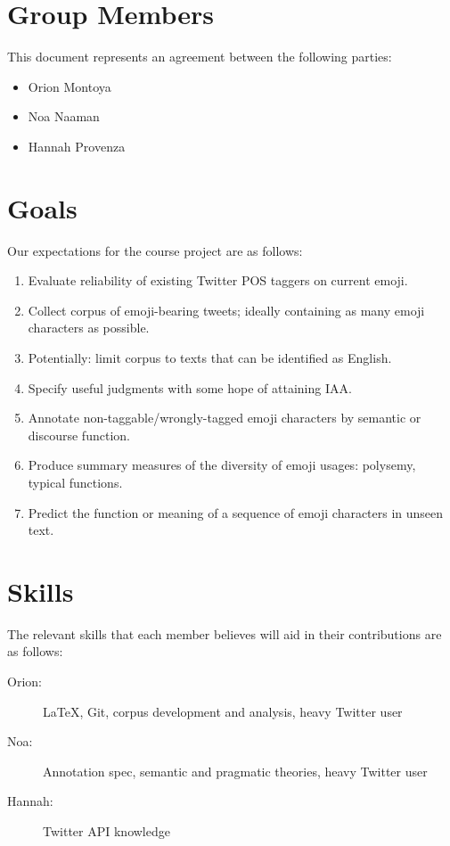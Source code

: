 \documentclass{article}
\newcommand{\groupmember}[1]{#1}
\begin{document}
\section{Group Members} %
\label{par:group_members}
This document represents an agreement between the following parties:
\begin{itemize}
    \item \groupmember{Orion Montoya}
    \item \groupmember{Noa Naaman}
    \item \groupmember{Hannah Provenza}
\end{itemize}

\section{Goals} %
\label{par:expectations}
Our expectations for the course project are as follows:
\begin{enumerate}
    \item Evaluate reliability of existing Twitter POS taggers on current emoji.
    \item Collect corpus of emoji-bearing tweets; ideally containing as many emoji characters as possible.
    \item Potentially: limit corpus to texts that can be identified as English.
    \item Specify useful judgments with some hope of attaining IAA.
    \item Annotate non-taggable/wrongly-tagged emoji characters by semantic or discourse function.
    \item Produce summary measures of the diversity of emoji usages: polysemy, typical functions.
    \item Predict the function or meaning of a sequence of emoji characters in unseen text.
\end{enumerate}

\section{Skills} %
\label{sec:skills}

The relevant skills that each member believes will aid in their contributions are as follows:

\begin{description}
  \item[\groupmember{Orion}:] \LaTeX, Git, corpus development and analysis, heavy Twitter user
    \item[\groupmember{Noa}:] Annotation spec, semantic and pragmatic theories, heavy Twitter user
    \item[\groupmember{Hannah}:] Twitter API knowledge
\end{description}
\end{document}
